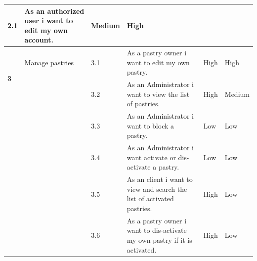\documentclass[12pt,a4paper]{report}
\begin{document}
\begin{table}[H]
\begin{center}
\begin{tabular}{|  p{1cm}|  p{4cm}|  p{1cm}| p{5cm}|  p{2cm}| p{2cm}|}
				2.1 &                        
				As an authorized user i want to edit my own account.&                        
				Medium &                        
				High
				\\
				\hline
				\multirow{2}{*}{\textbf{3} }
				&                        
				Manage pastries &                        
				3.1 &                        
				As a pastry owner i want to edit my own pastry.&                        
				High &                        
				High
				\\
				\cline{3-6}
				&                        
				&                        
				3.2 &                        
				As an Administrator i want to view the list of pastries.&                        
				High &                        
				Medium
				\\
				\cline{3-6}
				&                        
				&                        
				3.3 &                        
				As an Administrator i want to block a pastry.&                        
				Low &                        
				Low
				\\
				\cline{3-6}
				&                        
				&                        
				3.4 &                        
				As an Administrator i want activate or dis-activate a pastry.&                        
				Low &                        
				Low
				\\
				\cline{3-6}
				&                        
				&                        
				3.5 &                        
				As an client i want to view and search the list of activated pastries.&                        
				High &                        
				Low
					\\
				\cline{3-6}
				&                        
				&                        
				3.6 &                        
				As a pastry owner i want to dis-activate my own pastry if it is activated.&                        
				High &                        
				Low
				
				\\
				\hline
				
			\end{tabular}
			
		\end{center}
		
	\end{table}
\end{document}
